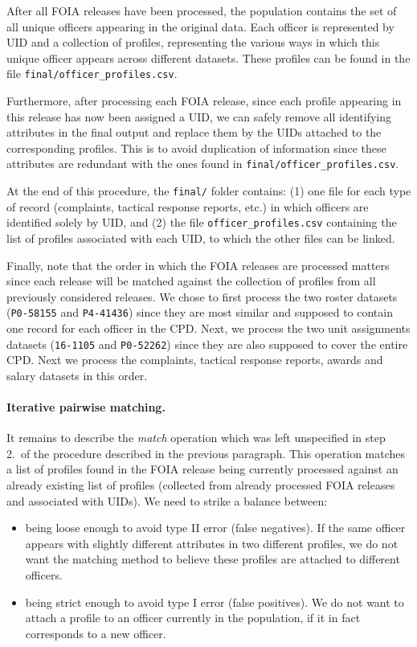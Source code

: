 After all FOIA releases have been processed, the population contains the set of
all unique officers appearing in the original data. Each officer is represented
by UID and a collection of profiles, representing the various ways in which
this unique officer appears across different datasets. These profiles can be
found in the file \texttt{final/officer\_profiles.csv}.

Furthermore, after processing each FOIA release, since each profile appearing
in this release has now been assigned a UID, we can safely remove all
identifying attributes in the final output and replace them by the UIDs
attached to the corresponding profiles. This is to avoid duplication of
information since these attributes are redundant with the ones found in
\texttt{final/officer\_profiles.csv}.

At the end of this procedure, the \texttt{final/} folder contains:  (1)
one file for each type of record (complaints, tactical response reports, etc.)
in which officers are identified solely by UID, and (2) the file
\texttt{officer\_profiles.csv} containing the list of profiles associated with
each UID, to which the other files can be linked.

Finally, note that the order in which the FOIA releases are processed matters
since each release will be matched against the collection of profiles from all
previously considered releases. We chose to first process the two roster datasets
(\texttt{P0-58155} and \texttt{P4-41436}) since they are most similar and
supposed to contain one record for each officer in the CPD. Next, we process
the two unit assignments datasets (\texttt{16-1105} and \texttt{P0-52262})
since they are also supposed to cover the entire CPD. Next we process the
complaints, tactical response reports, awards and salary datasets in this
order.

\paragraph{Iterative pairwise matching.}
It remains to describe the \emph{match} operation which was left unspecified in
step 2.\ of the procedure described in the previous paragraph. This operation
matches a list of profiles found in the FOIA release being currently processed
against an already existing list of profiles (collected from already processed
FOIA releases and associated with UIDs). We need to strike a balance between:
\begin{itemize}
	\item being loose enough to avoid type II error (false negatives). If the
		same officer appears with slightly different attributes in two
		different profiles, we do not want the matching method to believe these
		profiles are attached to different officers.
	\item being strict enough to avoid type I error (false positives). We do
		not want to attach a profile to an officer currently in the population,
		if it in fact corresponds to a new officer.
\end{itemize}

